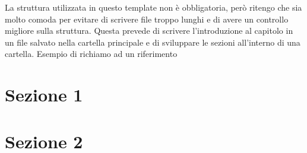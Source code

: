 La struttura utilizzata in questo template non è obbligatoria, però 
ritengo che sia molto comoda per evitare di scrivere file troppo lunghi e 
di avere un controllo migliore sulla struttura. Questa prevede di scrivere 
l'introduzione al capitolo in un file salvato nella cartella principale e di sviluppare 
le sezioni all'interno di una cartella. Esempio di richiamo ad un riferimento %

\section{Sezione 1}


\section{Sezione 2}
